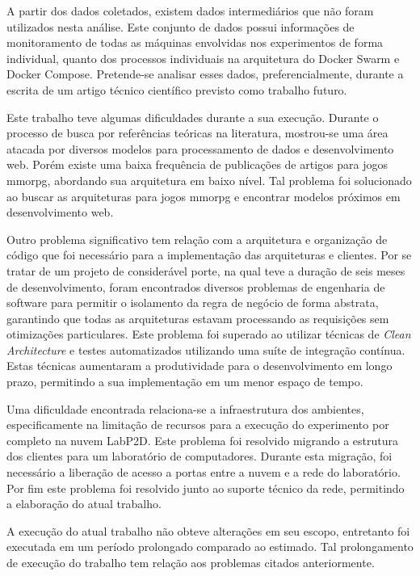 %
A partir dos dados coletados, existem dados intermediários que não foram utilizados nesta análise.
%
Este conjunto de dados possui informações de monitoramento de todas as máquinas envolvidas nos experimentos de forma individual, quanto dos processos individuais na arquitetura do Docker Swarm e Docker Compose.
%
Pretende-se analisar esses dados, preferencialmente, durante a escrita de um artigo técnico científico previsto como trabalho futuro.

Este trabalho teve algumas dificuldades durante a sua execução.
%
Durante o processo de busca por referências teóricas na literatura, mostrou-se uma área atacada por diversos modelos para processamento de dados e desenvolvimento web.
%
Porém existe uma baixa frequência de publicações de artigos para jogos \ac{mmorpg}, abordando sua arquitetura em baixo nível.
%
Tal problema foi solucionado ao buscar as arquiteturas para jogos \ac{mmorpg} e encontrar modelos próximos em desenvolvimento web.

Outro problema significativo tem relação com a arquitetura e organização de código que foi necessário para a implementação das arquiteturas e clientes.
%
Por se tratar de um projeto de considerável porte, na qual teve a duração de seis meses de desenvolvimento, foram encontrados diversos problemas de engenharia de software para permitir o isolamento da regra de negócio de forma abstrata, garantindo que todas as arquiteturas estavam processando as requisições sem otimizações particulares.
%
Este problema foi superado ao utilizar técnicas de \textit{Clean Architecture} e testes automatizados utilizando uma suíte de integração contínua.
%
Estas técnicas aumentaram a produtividade para o desenvolvimento em longo prazo, permitindo a sua implementação em um menor espaço de tempo.
%

Uma dificuldade encontrada relaciona-se a infraestrutura dos ambientes, especificamente na limitação de recursos para a execução do experimento por completo na nuvem LabP2D.
%
Este problema foi resolvido migrando a estrutura dos clientes para um laboratório de computadores.
%
Durante esta migração, foi necessário a liberação de acesso a portas entre a nuvem e a rede do laboratório.
%
Por fim este problema foi resolvido junto ao suporte técnico da rede, permitindo a elaboração do atual trabalho.

A execução do atual trabalho não obteve alterações em seu escopo, entretanto foi executada em um período prolongado comparado ao estimado.
%
Tal prolongamento de execução do trabalho tem relação aos problemas citados anteriormente.

